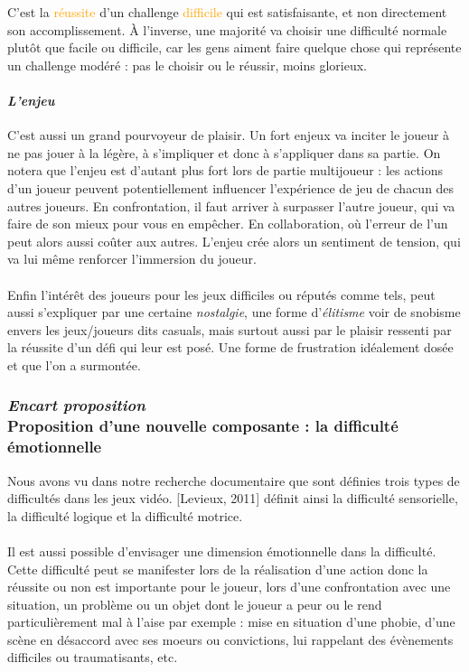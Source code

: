 C'est la \textcolor{orange}{réussite} d'un challenge \textcolor{orange}{difficile} qui est satisfaisante, et non directement son accomplissement. À l'inverse, une majorité va choisir une difficulté normale plutôt que facile ou difficile, car les gens aiment \textcolor{vert}{faire} quelque chose qui représente un \textcolor{vert}{challenge modéré} : pas le choisir ou le réussir, moins glorieux.

			\paragraph{\emph{L’enjeu} \\ \quad}
C’est aussi un grand pourvoyeur de plaisir. Un fort enjeux va inciter le joueur à ne pas jouer à la légère, à s’impliquer et donc à s’appliquer dans sa partie. On notera que l’enjeu est d’autant plus fort lors de partie multijoueur : les actions d’un joueur peuvent potentiellement influencer l’expérience de jeu de chacun des autres joueurs. En confrontation, il faut arriver à surpasser l’autre joueur, qui va faire de son mieux pour vous en empêcher. En collaboration, où l’erreur de l’un peut alors aussi coûter aux autres. L’enjeu crée alors un sentiment de tension, qui va lui même renforcer l’immersion du joueur.

\paragraph{}Enfin l’intérêt des joueurs pour les jeux difficiles ou réputés comme tels, peut aussi s’expliquer par une certaine \emph{nostalgie}, une forme d’\emph{élitisme} voir de snobisme envers les jeux/joueurs dits casuals, mais surtout aussi par le plaisir ressenti par la réussite d’un défi qui leur est posé. Une forme de frustration idéalement dosée et que l’on a surmontée.

\newpage
		
\subsubsection{\emph{Encart proposition \\} Proposition d'une nouvelle composante : la difficulté émotionnelle}
Nous avons vu dans notre recherche documentaire que sont définies trois types de difficultés dans les jeux vidéo. [Levieux, 2011]\cite{Levi11} définit ainsi la difficulté sensorielle, la difficulté logique et la difficulté motrice.

\paragraph{}Il est aussi possible d’envisager une dimension émotionnelle dans la difficulté. Cette difficulté peut se manifester lors de la réalisation d’une action donc la réussite ou non est importante pour le joueur, lors d’une confrontation avec une situation, un problème ou un objet dont le joueur a peur ou le rend particulièrement mal à l’aise par exemple : mise en situation d’une phobie, d’une scène en désaccord avec ses moeurs ou convictions, lui rappelant des évènements difficiles ou traumatisants, etc.
